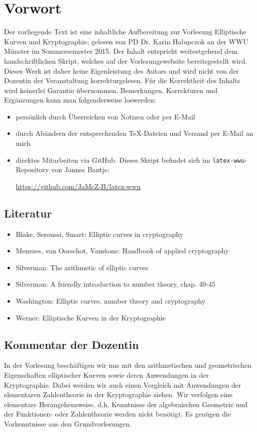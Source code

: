 \section*{Vorwort}
\label{sec:preface}
	Der vorliegende Text ist eine inhaltliche Aufbereitung zur Vorlesung Elliptische Kurven und Kryptographie, gelesen von PD Dr. Karin Halupczok an der WWU Münster im Sommersemester 2015. Der Inhalt entspricht weitestgehend dem handschriftlichen Skript, welches auf der Vorlesungswebsite bereitsgestellt wird. Dieses Werk ist daher keine Eigenleistung des Autors und wird nicht von der Dozentin der Veranstaltung korrekturgelesen. Für die Korrektheit des Inhalts wird keinerlei Garantie übernommen. Bemerkungen, Korrekturen und Ergänzungen kann man folgenderweise loswerden:
	\begin{itemize}
		\item persönlich durch Überreichen von Notizen oder per E-Mail
		\item durch Abändern der entsprechenden TeX-Dateien und Versand per E-Mail an mich
		\item direktes Mitarbeiten via GitHub. Dieses Skript befindet sich im \texttt{latex-wwu}-Repository von Jannes Bantje:
		\begin{center}
			\url{https://github.com/JaMeZ-B/latex-wwu}
		\end{center}
	\end{itemize}

\subsection*{Literatur}
\label{sub:lit}
\begin{itemize}
	\item Blake, Seroussi, Smart: Elliptic curves in cryptography
	\item Menezes, van Oorschot, Vanstone: Handbook of applied cryptography
	\item Silverman: The arithmetic of elliptic curves
	\item Silverman: A friendly introduction to number theory, chap. 40-45
	\item Washington: Elliptic curves, number theory and cryptography
	\item Werner: Elliptische Kurven in der Kryptographie
\end{itemize}

\subsection*{Kommentar der Dozentin}
In der Vorlesung beschäftigen wir uns mit den arithmetischen und geometrischen Eigenschaften elliptischer Kurven sowie deren Anwendungen in der Kryptographie. Dabei werden wir auch einen Vergleich mit Anwendungen der elementaren Zahlentheorie in der Kryptographie ziehen. Wir verfolgen eine elementare Herangehensweise, d.h. Kenntnisse der algebraischen Geometrie und der Funktionen- oder Zahlentheorie werden nicht benötigt. Es genügen die Vorkenntnisse aus den Grundvorlesungen.

